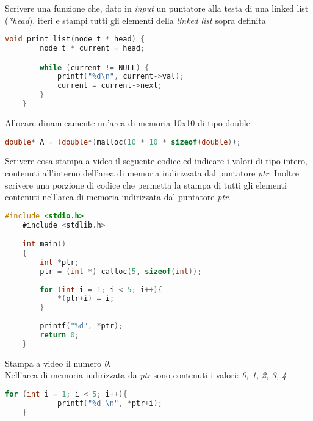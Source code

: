 \documentclass[addpoints,11pt]{exam}
\begin{document}
\begin{questions}
\question[2] 
Scrivere una funzione che, dato in \emph{input} un puntatore alla testa di una linked list (\emph{*head}), iteri e stampi tutti gli elementi della \emph{linked list} sopra definita


\begin{minipage}[t]{0.5\linewidth}
	\begin{lstlisting}[language=C]
	void print_list(node_t * head) {
		node_t * current = head;

		while (current != NULL) {
			printf("%d\n", current->val);
			current = current->next;
		}
	}
	\end{lstlisting}
\end{minipage}



\question[2]
Allocare dinamicamente un'area di memoria 10x10 di tipo double

\begin{minipage}[t]{0.5\linewidth}
	\begin{lstlisting}[language=C]
	double* A = (double*)malloc(10 * 10 * sizeof(double));
	\end{lstlisting}
\end{minipage}



\question[2]
Scrivere cosa stampa a video il seguente codice ed indicare i valori di tipo intero, contenuti all'interno dell'area di memoria indirizzata dal puntatore \emph{ptr}. Inoltre scrivere una porzione di codice che permetta la stampa di tutti gli elementi contenuti nell'area di memoria indirizzata dal puntatore \emph{ptr}.

\begin{minipage}[t]{0.5\linewidth}
	\begin{lstlisting}[language=C]
	#include <stdio.h>
	#include <stdlib.h>

	int main()
	{
		int *ptr;
		ptr = (int *) calloc(5, sizeof(int));
		
		for (int i = 1; i < 5; i++){
			*(ptr+i) = i;
		}
		
		printf("%d", *ptr);
		return 0;
	}
	\end{lstlisting}
\end{minipage}
\begin{minipage}[t]{0.5\linewidth}
	Stampa a video il numero \emph{0}. \\
	Nell'area di memoria indirizzata da \emph{ptr} sono contenuti i valori: \emph{0, 1, 2, 3, 4}
	
	\begin{lstlisting}[language=C]
	for (int i = 1; i < 5; i++){
		    printf("%d \n", *ptr+i);
	}
	\end{lstlisting}
	
\end{minipage}




\end{questions}
\end{document}
